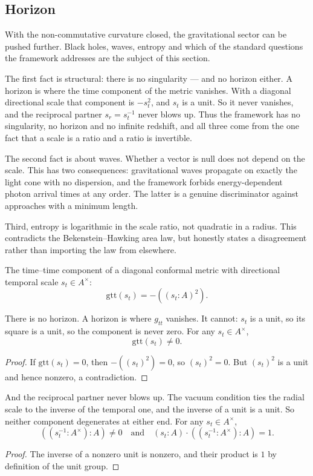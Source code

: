 \subsection{Horizon}

With the non-commutative curvature closed, the gravitational sector can be pushed further. Black holes, waves, entropy and which of the standard questions the framework addresses are the subject of this section.

The first fact is structural: there is no singularity — and no horizon either. A horizon is where the time component of the metric vanishes. With a diagonal directional scale that component is $-s_t^2$, and $s_t$ is a unit. So it never vanishes, and the reciprocal partner $s_r = s_t^{-1}$ never blows up. Thus the framework has no singularity, no horizon and no infinite redshift, and all three come from the one fact that a scale is a ratio and a ratio is invertible.

The second fact is about waves. Whether a vector is null does not depend on the scale. This has two consequences: gravitational waves propagate on exactly the light cone with no dispersion, and the framework forbids energy-dependent photon arrival times at any order. The latter is a genuine discriminator against approaches with a minimum length.

Third, entropy is logarithmic in the scale ratio, not quadratic in a radius. This contradicts the Bekenstein–Hawking area law, but honestly states a disagreement rather than importing the law from elsewhere.

\begin{definition}
The time–time component of a diagonal conformal metric with directional temporal scale $s_t \in A^\times$:
\[
\text{gtt}(s_t) = -((s_t : A)^2).
\]
\end{definition}

\begin{theorem}
There is no horizon. A horizon is where $g_{tt}$ vanishes. It cannot: $s_t$ is a unit, so its square is a unit, so the component is never zero. For any $s_t \in A^\times$,
\[
\text{gtt}(s_t) \neq 0.
\]
\begin{proof}
If $\text{gtt}(s_t) = 0$, then $-((s_t)^2) = 0$, so $(s_t)^2 = 0$. But $(s_t)^2$ is a unit and hence nonzero, a contradiction.
\end{proof}
\end{theorem}

\begin{theorem}
And the reciprocal partner never blows up. The vacuum condition ties the radial scale to the inverse of the temporal one, and the inverse of a unit is a unit. So neither component degenerates at either end. For any $s_t \in A^\times$,
\[
((s_t^{-1} : A^\times) : A) \neq 0 \quad \text{and} \quad (s_t : A) \cdot ((s_t^{-1} : A^\times) : A) = 1.
\]
\begin{proof}
The inverse of a nonzero unit is nonzero, and their product is $1$ by definition of the unit group.
\end{proof}
\end{theorem}

